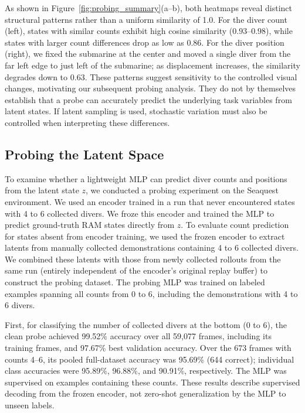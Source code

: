 \documentclass{article} %
\begin{document}
As shown in Figure~\ref{fig:probing_summary}(a--b), both heatmaps reveal distinct structural patterns rather than a uniform similarity of 1.0. For the diver count (left), states with similar counts exhibit high cosine similarity ($0.93$--$0.98$), while states with larger count differences drop as low as $0.86$. For the diver position (right), we fixed the submarine at the center and moved a single diver from the far left edge to just left of the submarine; as displacement increases, the similarity degrades down to $0.63$. These patterns suggest sensitivity to the controlled visual changes, motivating our subsequent probing analysis. They do not by themselves establish that a probe can accurately predict the underlying task variables from latent states. If latent sampling is used, stochastic variation must also be controlled when interpreting these differences.

\subsection{Probing the Latent Space}
\label{subsec:appendix_probing_latent}
To examine whether a lightweight MLP can predict diver counts and positions from the latent state $z$, we conducted a probing experiment on the Seaquest environment. We used an encoder trained in a run that never encountered states with 4 to 6 collected divers. We froze this encoder and trained the MLP to predict ground-truth RAM states directly from $z$. To evaluate count prediction for states absent from encoder training, we used the frozen encoder to extract latents from manually collected demonstrations containing 4 to 6 collected divers. We combined these latents with those from newly collected rollouts from the same run (entirely independent of the encoder's original replay buffer) to construct the probing dataset. The probing MLP was trained on labeled examples spanning all counts from 0 to 6, including the demonstrations with 4 to 6 divers.

First, for classifying the number of collected divers at the bottom (0 to 6), the clean probe achieved 99.52\% accuracy over all 59,077 frames, including its training frames, and 97.67\% best validation accuracy. Over the 673 frames with counts 4--6, its pooled full-dataset accuracy was 95.69\% (644 correct); individual class accuracies were 95.89\%, 96.88\%, and 90.91\%, respectively. The MLP was supervised on examples containing these counts. These results describe supervised decoding from the frozen encoder, not zero-shot generalization by the MLP to unseen labels.
\end{document}
